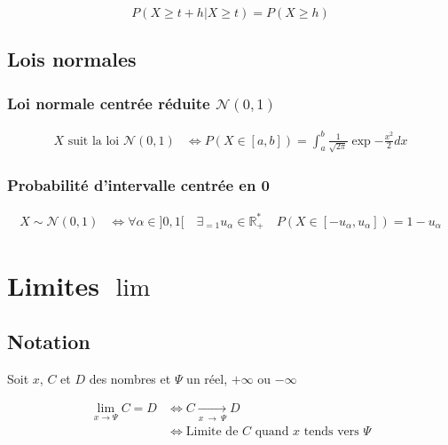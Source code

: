 \documentclass{article}
\newcommand{\R}{\mathds{R}}
\newcommand{\oo}{\infty}
\newcommand{\goesto}[2]{\xrightarrow[#1\:\to\:#2]{}}
\begin{document}
\[P(X \geq t+h | X \geq t) = P(X \geq h)\]                    

\subsection{Lois normales}

\subsubsection{Loi normale centrée réduite $\mathcal{N}(0, 1)$}

\begin{equation*}
    \begin{split}
        \text{$X$ suit la loi $\mathcal{N}(0, 1)$} &\iff P(X \in [a, b]) = \int_a^b \frac{1}{\sqrt{2\pi}} \exp{-\frac{x^2}{2}} dx
    \end{split}
\end{equation*}

\subsubsection{Probabilité d'intervalle centrée en 0}

\begin{equation*}
    \begin{split}
        X \sim \mathcal{N}(0, 1) &\iff \forall \alpha \in ]0, 1[ \quad \exists_{=1} u_\alpha \in \R_+^\ast \quad P(X \in [-u_\alpha, u_\alpha]) = 1 - u_\alpha
    \end{split}
\end{equation*}

\newpage\section{Limites $\lim$}

\subsection{Notation}

Soit $x$, $C$ et $D$ des nombres et $\Psi$ un réel, $+\oo$ ou $-\oo$

\begin{equation*}
    \begin{split}
        \lim_{x \to \Psi} C = D &\iff C \goesto{x}{\Psi} D \\
        &\iff \text{Limite de $C$ quand $x$ tends vers $\Psi$}
    \end{split}
\end{equation*}
\end{document}
